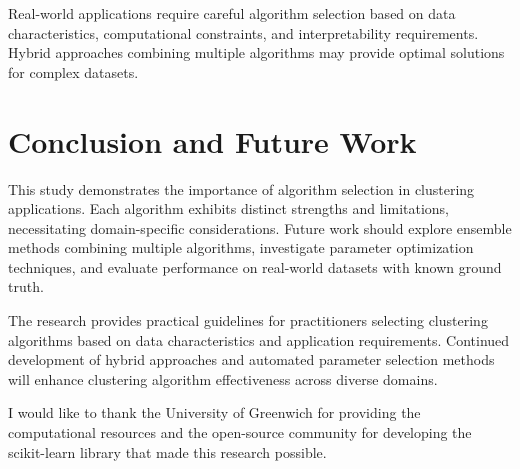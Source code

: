 \documentclass{COMPXXXX}
\begin{document}
Real-world applications require careful algorithm selection based on data characteristics, computational constraints, and interpretability requirements. Hybrid approaches combining multiple algorithms may provide optimal solutions for complex datasets.

\section{Conclusion and Future Work}

This study demonstrates the importance of algorithm selection in clustering applications. Each algorithm exhibits distinct strengths and limitations, necessitating domain-specific considerations. Future work should explore ensemble methods combining multiple algorithms, investigate parameter optimization techniques, and evaluate performance on real-world datasets with known ground truth.

The research provides practical guidelines for practitioners selecting clustering algorithms based on data characteristics and application requirements. Continued development of hybrid approaches and automated parameter selection methods will enhance clustering algorithm effectiveness across diverse domains.

\ack
I would like to thank the University of Greenwich for providing the computational resources and the open-source community for developing the scikit-learn library that made this research possible.


\end{document}

